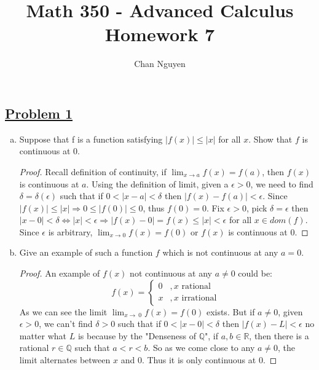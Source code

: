 \documentclass[10pt,letterpaper]{article}
\title{\textbf{Math 350 - Advanced Calculus \\ Homework 7}}
\author{Chan Nguyen}
\begin{document}
\tableofcontents 
\maketitle

\setlength{\parindent}{0pt}
\setlength{\parskip}{1ex}
	\subsection*{{\color{purple}\underline{Problem 1}}}
	\begin{enumerate}[(a)]	
	\item Suppose that f is a function satisfying $|f(x)| \leq |x|$ for all $x$. Show that $f$ is continuous
at $0$. \\
	\begin{proof}
		Recall definition of continuity, if $\displaystyle\lim_{x\to a}f(x) = f(a)$, then $f(x)$
		is continuous at $a$. Using the definition of limit, given a $\epsilon > 0$, we need
		to find $\delta = \delta(\epsilon)$ such that if $0 < |x - a| < \delta$ then $|f(x) - f(a)| < \epsilon$.
		Since $|f(x)| \leq |x| \Rightarrow 0 \leq |f(0)| \leq 0$, thus $f(0) = 0$. Fix
		$\epsilon > 0$, pick $\delta = \epsilon$ then $|x - 0| < \delta 
		\Leftrightarrow |x| < \epsilon \Rightarrow
		|f(x) - 0| = f(x) \leq |x| < \epsilon$ for all $x \in dom(f)$. Since $\epsilon$ is arbitrary,
		$\displaystyle\lim_{x\to 0}f(x) = f(0)$ or $f(x)$ is continuous at $0$.
	\end{proof}
	
	\item Give an example of such a function $f$ which is not continuous at any $a = 0$. 
	\begin{proof}
	An example of $f(x)$ not continuous at any $a \neq 0$ could be:
	$$f(x) = 
	\begin{cases}
		0  &, x \text{ rational } \\
		x  &, x \text{ irrational } 
	\end{cases}
	$$ 
	As we can see the limit $\displaystyle\lim_{x\to\ 0}f(x) = f(0)$ exists. But
	if $a \neq 0$, given $\epsilon > 0$, we
	can't find $\delta > 0$ such that if $0 < |x - 0| < \delta$ then $|f(x) - L| < \epsilon$
	no matter what $L$ is because by the "Denseness of $\mathbb{Q}$", if $a, b \in \mathbb{R}$,
	then there is a rational $r \in \mathbb{Q}$ such that $a < r < b$. So as we come close 
	to any $a \neq 0$, the limit alternates between $x$ and $0$. Thus it is only continuous at $0$.	
	\end{proof}
	

\end{enumerate}
\end{document}
